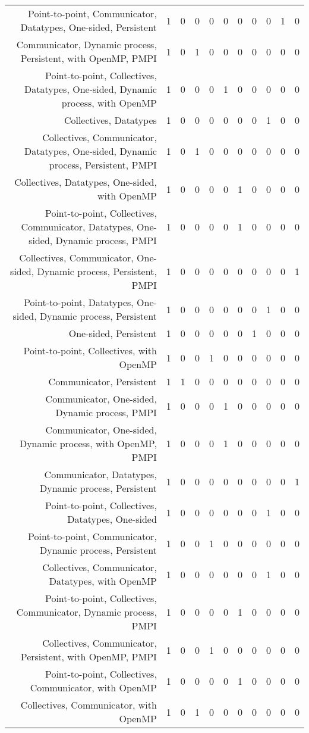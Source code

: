 {\begin{landscape}
\begin{longtable}[htb]{r|c|c|c|c|c|c|c|c|c|c}
{Point-to-point, Communicator, Datatypes, One-sided, Persistent} & 1 & 0 & 0 & 0 & 0 & 0 & 0 & 0 & 1 & 0 \\%
{Communicator, Dynamic process, Persistent, with OpenMP, PMPI} & 1 & 0 & 1 & 0 & 0 & 0 & 0 & 0 & 0 & 0 \\%
{Point-to-point, Collectives, Datatypes, One-sided, Dynamic process, with OpenMP} & 1 & 0 & 0 & 0 & 1 & 0 & 0 & 0 & 0 & 0 \\%
{Collectives, Datatypes} & 1 & 0 & 0 & 0 & 0 & 0 & 0 & 1 & 0 & 0 \\%
{Collectives, Communicator, Datatypes, One-sided, Dynamic process, Persistent, PMPI} & 1 & 0 & 1 & 0 & 0 & 0 & 0 & 0 & 0 & 0 \\%
{Collectives, Datatypes, One-sided, with OpenMP} & 1 & 0 & 0 & 0 & 0 & 1 & 0 & 0 & 0 & 0 \\%
{Point-to-point, Collectives, Communicator, Datatypes, One-sided, Dynamic process, PMPI} & 1 & 0 & 0 & 0 & 0 & 1 & 0 & 0 & 0 & 0 \\%
{Collectives, Communicator, One-sided, Dynamic process, Persistent, PMPI} & 1 & 0 & 0 & 0 & 0 & 0 & 0 & 0 & 0 & 1 \\%
{Point-to-point, Datatypes, One-sided, Dynamic process, Persistent} & 1 & 0 & 0 & 0 & 0 & 0 & 0 & 1 & 0 & 0 \\%
{One-sided, Persistent} & 1 & 0 & 0 & 0 & 0 & 0 & 1 & 0 & 0 & 0 \\%
{Point-to-point, Collectives, with OpenMP} & 1 & 0 & 0 & 1 & 0 & 0 & 0 & 0 & 0 & 0 \\%
{Communicator, Persistent} & 1 & 1 & 0 & 0 & 0 & 0 & 0 & 0 & 0 & 0 \\%
{Communicator, One-sided, Dynamic process, PMPI} & 1 & 0 & 0 & 0 & 1 & 0 & 0 & 0 & 0 & 0 \\%
{Communicator, One-sided, Dynamic process, with OpenMP, PMPI} & 1 & 0 & 0 & 0 & 1 & 0 & 0 & 0 & 0 & 0 \\%
{Communicator, Datatypes, Dynamic process, Persistent} & 1 & 0 & 0 & 0 & 0 & 0 & 0 & 0 & 0 & 1 \\%
{Point-to-point, Collectives, Datatypes, One-sided} & 1 & 0 & 0 & 0 & 0 & 0 & 0 & 1 & 0 & 0 \\%
{Point-to-point, Communicator, Dynamic process, Persistent} & 1 & 0 & 0 & 1 & 0 & 0 & 0 & 0 & 0 & 0 \\%
{Collectives, Communicator, Datatypes, with OpenMP} & 1 & 0 & 0 & 0 & 0 & 0 & 0 & 1 & 0 & 0 \\%
{Point-to-point, Collectives, Communicator, Dynamic process, PMPI} & 1 & 0 & 0 & 0 & 0 & 1 & 0 & 0 & 0 & 0 \\%
{Collectives, Communicator, Persistent, with OpenMP, PMPI} & 1 & 0 & 0 & 1 & 0 & 0 & 0 & 0 & 0 & 0 \\%
{Point-to-point, Collectives, Communicator, with OpenMP} & 1 & 0 & 0 & 0 & 0 & 1 & 0 & 0 & 0 & 0 \\%
{Collectives, Communicator, with OpenMP} & 1 & 0 & 1 & 0 & 0 & 0 & 0 & 0 & 0 & 0 \\%
\hline%
\end{longtable}%
\end{landscape}}%
\clearpage%
